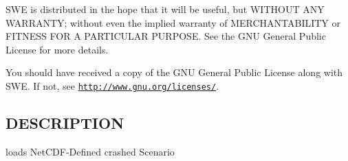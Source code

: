 S\-W\-E is distributed in the hope that it will be useful, but W\-I\-T\-H\-O\-U\-T A\-N\-Y W\-A\-R\-R\-A\-N\-T\-Y; without even the implied warranty of M\-E\-R\-C\-H\-A\-N\-T\-A\-B\-I\-L\-I\-T\-Y or F\-I\-T\-N\-E\-S\-S F\-O\-R A P\-A\-R\-T\-I\-C\-U\-L\-A\-R P\-U\-R\-P\-O\-S\-E. See the G\-N\-U General Public License for more details.

You should have received a copy of the G\-N\-U General Public License along with S\-W\-E. If not, see \href{http://www.gnu.org/licenses/}{\tt http\-://www.\-gnu.\-org/licenses/}.\hypertarget{NetCdfWriter_8hh_DESCRIPTION}{}\subsection{D\-E\-S\-C\-R\-I\-P\-T\-I\-O\-N}\label{NetCdfWriter_8hh_DESCRIPTION}
loads Net\-C\-D\-F-\/\-Defined crashed Scenario 